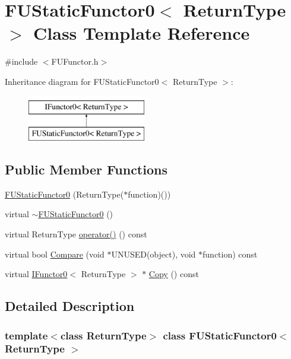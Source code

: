 \hypertarget{classFUStaticFunctor0}{
\section{FUStaticFunctor0$<$ ReturnType $>$ Class Template Reference}
\label{classFUStaticFunctor0}
}


{\ttfamily \#include $<$FUFunctor.h$>$}

Inheritance diagram for FUStaticFunctor0$<$ ReturnType $>$:\begin{figure}[H]
\begin{center}
\leavevmode
\includegraphics[height=2.000000cm]{classFUStaticFunctor0}
\end{center}
\end{figure}
\subsection*{Public Member Functions}
\begin{DoxyCompactItemize}
\item 
\hyperlink{classFUStaticFunctor0_af10fe6f9f1618387e41a53f06755e624}{FUStaticFunctor0} (ReturnType($\ast$function)())
\item 
virtual \hyperlink{classFUStaticFunctor0_a7cda24b05082a5a198151826cd1a58c4}{$\sim$FUStaticFunctor0} ()
\item 
virtual ReturnType \hyperlink{classFUStaticFunctor0_ada99df056b9ad315e2929abf80587079}{operator()} () const 
\item 
virtual bool \hyperlink{classFUStaticFunctor0_affea30b63204e9040d25fe8a6850ab38}{Compare} (void $\ast$UNUSED(object), void $\ast$function) const 
\item 
virtual \hyperlink{classIFunctor0}{IFunctor0}$<$ ReturnType $>$ $\ast$ \hyperlink{classFUStaticFunctor0_a55652de3f0cc26840f45763fe9b168f0}{Copy} () const 
\end{DoxyCompactItemize}


\subsection{Detailed Description}
\subsubsection*{template$<$class ReturnType$>$ class FUStaticFunctor0$<$ ReturnType $>$}

